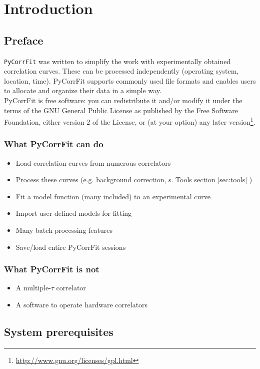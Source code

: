 \section{Introduction}

\subsection{Preface}
\texttt{PyCorrFit} was written to simplify the work with experimentally obtained correlation curves. These can be processed independently (operating system, location, time). PyCorrFit supports commonly used file formats and enables users to allocate and organize their data in a simple way.\\

\noindent PyCorrFit is free software: you can redistribute it and/or modify it
under the terms of the GNU General Public License as published 
by the Free Software Foundation, either version 2 of the License, 
or (at your option) any later version\footnote{\url{http://www.gnu.org/licenses/gpl.html}}.

\subsubsection*{What PyCorrFit can do}
\begin{itemize}
\item Load correlation curves from numerous correlators
\item Process these curves (e.g. background correction, s. Tools section \ref{sec:tools} )
\item Fit a model function (many included) to an experimental curve
\item Import user defined models for fitting
\item Many batch processing features
\item Save/load entire PyCorrFit sessions
\end{itemize}

\subsubsection*{What PyCorrFit is not}
\begin{itemize}
\item A multiple-$\tau$ correlator
\item A software to operate hardware correlators
\end{itemize}

\subsection{System prerequisites}
